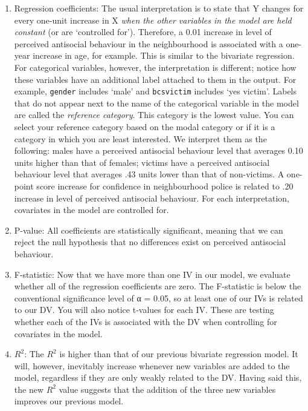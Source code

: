 \documentclass[
]{book}
\begin{document}
\begin{enumerate}
\def\labelenumi{\arabic{enumi}.}
\item
  Regression coefficients: The usual interpretation is to state that Y changes for every one-unit increase in X \emph{when the other variables in the model are held constant} (or are `controlled for'). Therefore, a 0.01 increase in level of perceived antisocial behaviour in the neighbourhood is associated with a one-year increase in age, for example. This is similar to the bivariate regression. For categorical variables, however, the interpretation is different; notice how these variables have an additional label attached to them in the output. For example, \texttt{gender} includes `male' and \texttt{bcsvictim} includes `yes victim'. Labels that do not appear next to the name of the categorical variable in the model are called the \emph{reference category}. This category is the lowest value. You can select your reference category based on the modal category or if it is a category in which you are least interested. We interpret them as the following: males have a perceived antisocial behaviour level that averages 0.10 units higher than that of females; victims have a perceived antisocial behaviour level that averages .43 units lower than that of non-victims. A one-point score increase for confidence in neighbourhood police is related to .20 increase in level of perceived antisocial behaviour. For each interpretation, covariates in the model are controlled for.
\item
  P-value: All coefficients are statistically significant, meaning that we can reject the null hypothesis that no differences exist on perceived antisocial behaviour.
\item
  F-statistic: Now that we have more than one IV in our model, we evaluate whether all of the regression coefficients are zero. The F-statistic is below the conventional significance level of α = 0.05, so at least one of our IVs is related to our DV. You will also notice t-values for each IV. These are testing whether each of the IVs is associated with the DV when controlling for covariates in the model.
\item
  \(R^2\): The \(R^2\) is higher than that of our previous bivariate regression model. It will, however, inevitably increase whenever new variables are added to the model, regardless if they are only weakly related to the DV. Having said this, the new \(R^2\) value suggests that the addition of the three new variables improves our previous model.
\end{enumerate}
\end{document}
